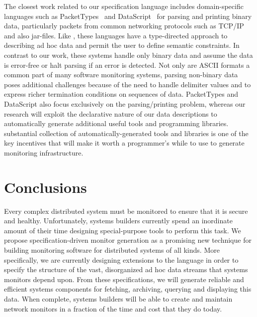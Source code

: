 \documentclass{sigplanconf}
\begin{document}
The closest work related to our specification language includes domain-specific
languages such as PacketTypes~\cite{sigcomm00} and DataScript~\cite{gpce02} 
for parsing and printing binary data, particularly packets
from common networking protocols such as \textsc{TCP/IP} and also
\java{} jar-files.  Like \pads{}, these languages have a type-directed
approach to describing ad hoc data and permit the user to define
semantic constraints.  In contrast to our work, these systems handle
only binary data and assume the data is error-free or halt parsing if
an error is detected.  Not only are ASCII formats a common part of
many software monitoring systems, parsing non-binary data poses additional
challenges because of the need to handle delimiter values and to
express richer termination conditions on sequences of data. 
PacketTypes and DataScript also focus exclusively on the 
parsing/printing problem,
whereas our research will exploit the declarative nature of our data
descriptions to automatically generate additional useful tools and
programming libraries.  \pads{} substantial 
collection of automatically-generated tools and libraries is 
one of the key incentives that will make it
worth a programmer's while to use \pads{} to generate 
monitoring infrastructure.


\section{Conclusions}
\label{sec:conclusion}

Every complex distributed system must be monitored to ensure that it is secure and healthy.  Unfortunately,
systems builders currently spend an inordinate amount of their time designing special-purpose tools
to perform this task.  We propose specification-driven 
monitor generation as a promising new technique for building
monitoring software for distributed systems of all kinds.  More specifically, we are currently designing 
extensions to the \pads{} language in order to specify the structure of the vast, disorganized ad hoc data streams
that systems monitors depend upon.  From these specifications, we will generate reliable and efficient systems
components for fetching, archiving, querying and displaying this data.  When complete, systems builders will
be able to create and maintain network monitors in a fraction of the time and cost that they do today.

{
\small

}
\end{document}
